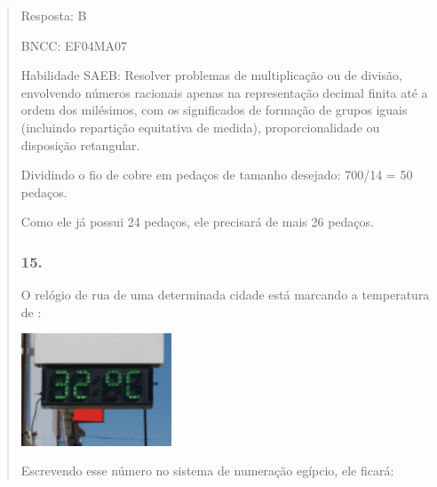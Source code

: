 \begin{enumerate}
\begin{escolha}
\begin{enumerate}
\begin{itemize}
\begin{itemize}
\begin{escolha}
\begin{quote}
\begin{escolha}
{Resposta: B

BNCC: EF04MA07

Habilidade SAEB: Resolver problemas de multiplicação ou de divisão,
envolvendo números racionais apenas na representação decimal finita até
a ordem dos milésimos, com os significados de formação de grupos iguais
(incluindo repartição equitativa de medida), proporcionalidade ou
disposição retangular.

Dividindo o fio de cobre em pedaços de tamanho desejado: 700/14 = 50
pedaços.

Como ele já possui 24 pedaços, ele precisará de mais 26 pedaços.

\subsubsection{15.}\label{section-186}

O relógio de rua de uma determinada cidade está marcando a temperatura
de :

\includegraphics[width=1.75833in,height=1.31518in]{media/image162.png}

Escrevendo esse número no sistema de numeração egípcio, ele ficará:

}
\end{escolha}
\end{quote}
\end{escolha}
\end{itemize}
\end{itemize}
\end{enumerate}
\end{escolha}
\end{enumerate}
